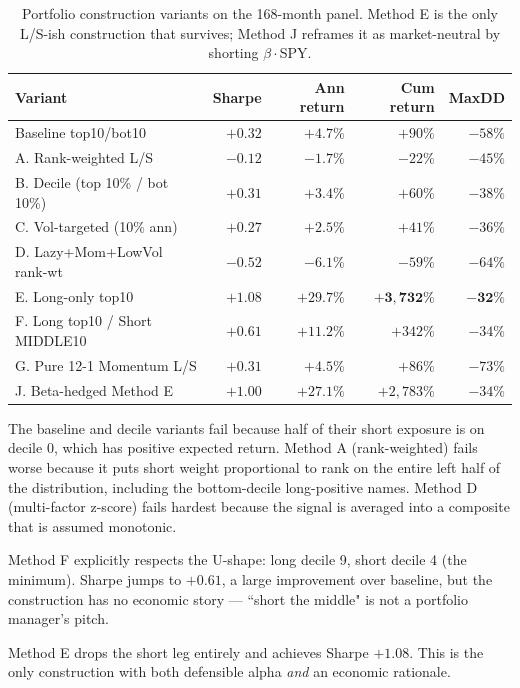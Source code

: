\documentclass[11pt]{article}
\begin{document}
\begin{table}[h]
\centering
\begin{tabular}{lrrrr}
\toprule
Variant & Sharpe & Ann return & Cum return & MaxDD \\
\midrule
Baseline top10/bot10           & $+0.32$ & $+4.7\%$   & $+90\%$     & $-58\%$ \\
A. Rank-weighted L/S           & $-0.12$ & $-1.7\%$   & $-22\%$     & $-45\%$ \\
B. Decile (top 10\% / bot 10\%) & $+0.31$ & $+3.4\%$   & $+60\%$     & $-38\%$ \\
C. Vol-targeted (10\% ann)     & $+0.27$ & $+2.5\%$   & $+41\%$     & $-36\%$ \\
D. Lazy+Mom+LowVol rank-wt     & $-0.52$ & $-6.1\%$   & $-59\%$     & $-64\%$ \\
E. Long-only top10             & $\mathbf{+1.08}$ & $\mathbf{+29.7\%}$ & $\mathbf{+3{,}732\%}$ & $\mathbf{-32\%}$ \\
F. Long top10 / Short MIDDLE10 & $+0.61$ & $+11.2\%$  & $+342\%$    & $-34\%$ \\
G. Pure 12-1 Momentum L/S      & $+0.31$ & $+4.5\%$   & $+86\%$     & $-73\%$ \\
J. Beta-hedged Method E        & $+1.00$ & $+27.1\%$  & $+2{,}783\%$ & $-34\%$ \\
\bottomrule
\end{tabular}
\caption{Portfolio construction variants on the 168-month panel. Method E is
  the only L/S-ish construction that survives; Method J reframes it as
  market-neutral by shorting $\beta \cdot$SPY.}
\label{tab:variants}
\end{table}

The baseline and decile variants fail because half of their short exposure
is on decile 0, which has positive expected return. Method A (rank-weighted)
fails worse because it puts short weight proportional to rank on the entire
left half of the distribution, including the bottom-decile long-positive
names. Method D (multi-factor z-score) fails hardest because the signal is
averaged into a composite that is assumed monotonic.

Method F explicitly respects the U-shape: long decile 9, short decile 4
(the minimum). Sharpe jumps to $+0.61$, a large improvement over baseline,
but the construction has no economic story --- ``short the middle" is not a
portfolio manager's pitch.

Method E drops the short leg entirely and achieves Sharpe $+1.08$. This is
the only construction with both defensible alpha \emph{and} an economic
rationale.
\end{document}
